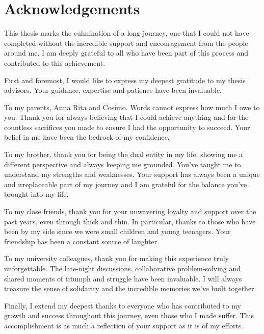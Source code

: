 \chapter*{Acknowledgements}

\setlength{\parindent}{0pt}
\setlength{\parskip}{4pt}

This thesis marks the culmination of a long journey, one that I could not have completed without the incredible support and encouragement from the people around me. I am deeply grateful to all who have been part of this process and contributed to this achievement.

First and foremost, I would like to express my deepest gratitude to my thesis advisors. Your guidance, expertise and patience have been invaluable.

To my parents, Anna Rita and Cosimo. Words cannot express how much I owe to you. Thank you for always believing that I could achieve anything and for the countless sacrifices you made to ensure I had the opportunity to succeed. Your belief in me have been the bedrock of my confidence.

To my brother, thank you for being the dual entity in my life, showing me a different perspective and always keeping me grounded. You've taught me to understand my strengths and weaknesses. Your support has always been a unique and irreplaceable part of my journey and I am grateful for the balance you've brought into my life.

To my close friends, thank you for your unwavering loyalty and support over the past years, even through thick and thin. In particular, thanks to those who have been by my side since we were small children and young teenagers. Your friendship has been a constant source of laughter.

To my university colleagues, thank you for making this experience truly unforgettable. The late-night discussions, collaborative problem-solving and shared moments of triumph and struggle have been invaluable. I will always treasure the sense of solidarity and the incredible memories we've built together.

Finally, I extend my deepest thanks to everyone who has contributed to my growth and success throughout this journey, even those who I made suffer. This accomplishment is as much a reflection of your support as it is of my efforts.
